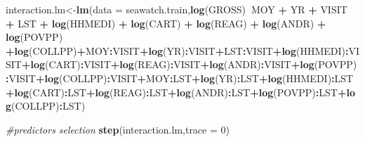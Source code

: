 \documentclass[]{article}
\newenvironment{Shaded}{\begin{snugshade}}{\end{snugshade}}
\newcommand{\KeywordTok}[1]{\textcolor[rgb]{0.13,0.29,0.53}{\textbf{#1}}}
\newcommand{\DataTypeTok}[1]{\textcolor[rgb]{0.13,0.29,0.53}{#1}}
\newcommand{\DecValTok}[1]{\textcolor[rgb]{0.00,0.00,0.81}{#1}}
\newcommand{\StringTok}[1]{\textcolor[rgb]{0.31,0.60,0.02}{#1}}
\newcommand{\CommentTok}[1]{\textcolor[rgb]{0.56,0.35,0.01}{\textit{#1}}}
\newcommand{\OperatorTok}[1]{\textcolor[rgb]{0.81,0.36,0.00}{\textbf{#1}}}
\newcommand{\NormalTok}[1]{#1}
\begin{document}
\begin{Shaded}
\begin{Highlighting}[]
\NormalTok{interaction.lm<-}\KeywordTok{lm}\NormalTok{(}\DataTypeTok{data =}\NormalTok{ seawatch.train,}\KeywordTok{log}\NormalTok{(GROSS)}\OperatorTok{~}\NormalTok{MOY }\OperatorTok{+}\StringTok{ }\NormalTok{YR }\OperatorTok{+}\StringTok{ }\NormalTok{VISIT }\OperatorTok{+}\StringTok{ }\NormalTok{LST }\OperatorTok{+}\StringTok{ }\KeywordTok{log}\NormalTok{(HHMEDI) }\OperatorTok{+}\StringTok{ }\KeywordTok{log}\NormalTok{(CART) }\OperatorTok{+}\StringTok{  }\KeywordTok{log}\NormalTok{(REAG) }\OperatorTok{+}\StringTok{ }\KeywordTok{log}\NormalTok{(ANDR) }\OperatorTok{+}\StringTok{ }\KeywordTok{log}\NormalTok{(POVPP) }\OperatorTok{+}\KeywordTok{log}\NormalTok{(COLLPP)}\OperatorTok{+}\NormalTok{MOY}\OperatorTok{:}\NormalTok{VISIT}\OperatorTok{+}\KeywordTok{log}\NormalTok{(YR)}\OperatorTok{:}\NormalTok{VISIT}\OperatorTok{+}\NormalTok{LST}\OperatorTok{:}\NormalTok{VISIT}\OperatorTok{+}\KeywordTok{log}\NormalTok{(HHMEDI)}\OperatorTok{:}\NormalTok{VISIT}\OperatorTok{+}\KeywordTok{log}\NormalTok{(CART)}\OperatorTok{:}\NormalTok{VISIT}\OperatorTok{+}\KeywordTok{log}\NormalTok{(REAG)}\OperatorTok{:}\NormalTok{VISIT}\OperatorTok{+}\KeywordTok{log}\NormalTok{(ANDR)}\OperatorTok{:}\NormalTok{VISIT}\OperatorTok{+}\KeywordTok{log}\NormalTok{(POVPP)}\OperatorTok{:}\NormalTok{VISIT}\OperatorTok{+}\KeywordTok{log}\NormalTok{(COLLPP)}\OperatorTok{:}\NormalTok{VISIT}\OperatorTok{+}\NormalTok{MOY}\OperatorTok{:}\NormalTok{LST}\OperatorTok{+}\KeywordTok{log}\NormalTok{(YR)}\OperatorTok{:}\NormalTok{LST}\OperatorTok{+}\KeywordTok{log}\NormalTok{(HHMEDI)}\OperatorTok{:}\NormalTok{LST}\OperatorTok{+}\KeywordTok{log}\NormalTok{(CART)}\OperatorTok{:}\NormalTok{LST}\OperatorTok{+}\KeywordTok{log}\NormalTok{(REAG)}\OperatorTok{:}\NormalTok{LST}\OperatorTok{+}\KeywordTok{log}\NormalTok{(ANDR)}\OperatorTok{:}\NormalTok{LST}\OperatorTok{+}\KeywordTok{log}\NormalTok{(POVPP)}\OperatorTok{:}\NormalTok{LST}\OperatorTok{+}\KeywordTok{log}\NormalTok{(COLLPP)}\OperatorTok{:}\NormalTok{LST)}

\CommentTok{#predictors selection}
\KeywordTok{step}\NormalTok{(interaction.lm,}\DataTypeTok{trace =} \DecValTok{0}\NormalTok{)}
\end{Highlighting}
\end{Shaded}
\end{document}
